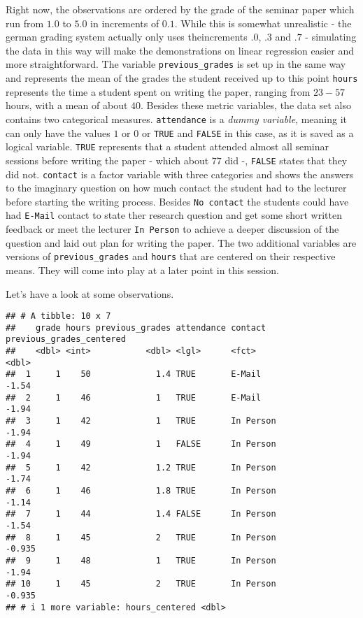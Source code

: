 \documentclass[
]{book}
\begin{document}
Right now, the observations are ordered by the grade of the seminar paper which
run from \(1.0\) to \(5.0\) in increments of \(0.1\). While this is somewhat
unrealistic - the german grading system actually only uses theincrements \(.0\),
\(.3\) and \(.7\) - simulating the data in this way will make the demonstrations on
linear regression easier and more straightforward. The variable
\texttt{previous\_grades} is set up in the same way and represents the mean of the
grades the student received up to this point \texttt{hours} represents the time a
student spent on writing the paper, ranging from \(23 - 57\) hours, with a mean of
about \(40\). Besides these metric variables, the data set also contains two
categorical measures. \texttt{attendance} is a \emph{dummy variable}, meaning it can only
have the values \(1\) or \(0\) or \texttt{TRUE} and \texttt{FALSE} in this case, as it is saved as
a logical variable. \texttt{TRUE} represents that a student attended almost all seminar
sessions before writing the paper - which about \(77%
\) did -, \texttt{FALSE} states that
they did not.
\texttt{contact} is a factor variable with three categories and shows the answers to
the imaginary question on how much contact the student had to the lecturer
before starting the writing process. Besides \texttt{No\ contact} the students could
have had \texttt{E-Mail} contact to state ther research question and get some short
written feedback or meet the lecturer \texttt{In\ Person} to achieve a deeper discussion
of the question and laid out plan for writing the paper.
The two additional variables are versions of \texttt{previous\_grades} and \texttt{hours} that
are centered on their respective means. They will come into play at a later
point in this session.

Let's have a look at some observations.

\begin{verbatim}
## # A tibble: 10 x 7
##    grade hours previous_grades attendance contact   previous_grades_centered
##    <dbl> <int>           <dbl> <lgl>      <fct>                        <dbl>
##  1     1    50             1.4 TRUE       E-Mail                      -1.54 
##  2     1    46             1   TRUE       E-Mail                      -1.94 
##  3     1    42             1   TRUE       In Person                   -1.94 
##  4     1    49             1   FALSE      In Person                   -1.94 
##  5     1    42             1.2 TRUE       In Person                   -1.74 
##  6     1    46             1.8 TRUE       In Person                   -1.14 
##  7     1    44             1.4 FALSE      In Person                   -1.54 
##  8     1    45             2   TRUE       In Person                   -0.935
##  9     1    48             1   TRUE       In Person                   -1.94 
## 10     1    45             2   TRUE       In Person                   -0.935
## # i 1 more variable: hours_centered <dbl>
\end{verbatim}
\end{document}
